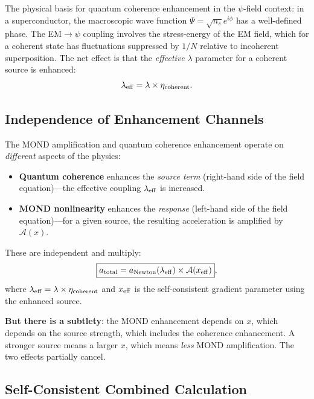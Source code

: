 \documentclass[aps,prd,twocolumn,superscriptaddress,nofootinbib]{revtex4-2}
\newcommand{\lam}{\lambda}
\begin{document}
The physical basis for quantum coherence enhancement in the
$\psi$-field context: in a superconductor, the macroscopic wave
function $\Psi = \sqrt{n_s}e^{i\phi}$ has a well-defined phase.
The EM$\to\psi$ coupling involves the stress-energy of the EM
field, which for a coherent state has fluctuations suppressed
by $1/N$ relative to incoherent superposition.  The net effect
is that the \emph{effective} $\lam$ parameter for a coherent
source is enhanced:
\begin{equation}
\lam_{\rm eff} = \lam \times \eta_{\rm coherent}.
\end{equation}

\subsection{Independence of Enhancement Channels}

The MOND amplification and quantum coherence enhancement operate
on \emph{different} aspects of the physics:

\begin{itemize}[nosep]
\item \textbf{Quantum coherence} enhances the \emph{source term}
(right-hand side of the field equation)---the effective coupling
$\lam_{\rm eff}$ is increased.
\item \textbf{MOND nonlinearity} enhances the \emph{response}
(left-hand side of the field equation)---for a given source, the
resulting acceleration is amplified by $\mathcal{A}(x)$.
\end{itemize}

These are independent and multiply:
\begin{equation}\label{eq:total-enhancement}
\boxed{a_{\rm total} = a_{\rm Newton}(\lam_{\rm eff}) \times \mathcal{A}(x_{\rm eff})},
\end{equation}
where $\lam_{\rm eff} = \lam\times\eta_{\rm coherent}$ and $x_{\rm eff}$
is the self-consistent gradient parameter using the enhanced source.

\textbf{But there is a subtlety}: the MOND enhancement depends on
$x$, which depends on the source strength, which includes the coherence
enhancement.  A stronger source means a larger $x$, which means
\emph{less} MOND amplification.  The two effects partially cancel.

\subsection{Self-Consistent Combined Calculation}
\end{document}
